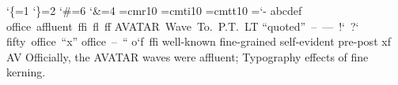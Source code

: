 \catcode`\{=1 \catcode`\}=2 \catcode`\#=6 \catcode`\&=4
\font\tenrm=cmr10 \tenrm \font\tenit=cmti10 \font\tentt=cmtt10
\baselineskip=12pt \lineskip=1pt \lineskiplimit=0pt \parindent=0pt \hsize=200pt \hyphenchar\tenrm=`-
\hbox{abcdef}
\hbox{office affluent ffi fl ff}
\hbox{AVATAR Wave To. P.T. LT}
\hbox{``quoted'' -- --- !` ?`}
\hbox{\tenit fifty office ``x''}
\hbox{\tentt office -- ``}
\hbox{o\char`f f\noboundary fi}
\vbox{\hsize=60pt  well-known fine-grained self-evident pre-post}
\hbox{x\/f\/}
\hbox{A\relax V}
\vbox{\hsize=150pt Officially, the AVATAR waves were affluent; Typography effects of fine kerning.}
